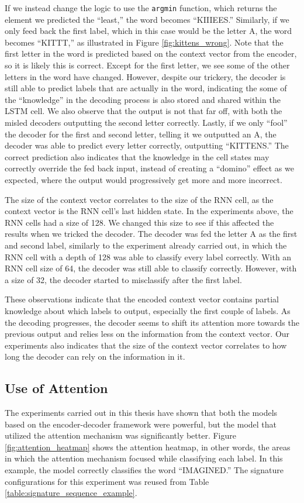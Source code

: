 If we instead change the logic to use the {\tt argmin} function, which returns the element we predicted the ``least,'' the word becomes ``KIIIEES.'' Similarly, if we only feed back the first label, which in this case would be the letter A, the word becomes ``KITTT,'' as illustrated in Figure \ref{fig:kittens_wrong}. Note that the first letter in the word is predicted based on the context vector from the encoder, so it is likely this is correct. Except for the first letter, we see some of the other letters in the word have changed. However, despite our trickery, the decoder is still able to predict labels that are actually in the word, indicating the some of the ``knowledge'' in the decoding process is also stored and shared within the LSTM cell. We also observe that the output is not that far off, with both the misled decoders outputting the second letter correctly. Lastly, if we only ``fool'' the decoder for the first and second letter, telling it we outputted an A, the decoder was able to predict every letter correctly, outputting ``KITTENS.'' The correct prediction also indicates that the knowledge in the cell states may correctly override the fed back input, instead of creating a ``domino'' effect as we expected, where the output would progressively get more and more incorrect.

The size of the context vector correlates to the size of the RNN cell, as the context vector is the RNN cell's last hidden state. In the experiments above, the RNN cells had a size of 128. We changed this size to see if this affected the results when we tricked the decoder. The decoder was fed the letter A as the first and second label, similarly to the experiment already carried out, in which the RNN cell with a depth of 128 was able to classify every label correctly. With an RNN cell size of 64, the decoder was still able to classify correctly. However, with a size of 32, the decoder started to misclassify after the first label.

These observations indicate that the encoded context vector contains partial knowledge about which labels to output, especially the first couple of labels. As the decoding progresses, the decoder seems to shift its attention more towards the previous output and relies less on the information from the context vector. Our experiments also indicates that the size of the context vector correlates to how long the decoder can rely on the information in it.

\subsection{Use of Attention}
The experiments carried out in this thesis have shown that both the models based on the encoder-decoder framework were powerful, but the model that utilized the attention mechanism was significantly better. Figure \ref{fig:attention_heatmap} shows the attention heatmap, in other words, the areas in which the attention mechanism focused while classifying each label. In this example, the model correctly classifies the word ``IMAGINED.'' The signature configurations for this experiment was reused from Table \ref{table:signature_sequence_example}.

